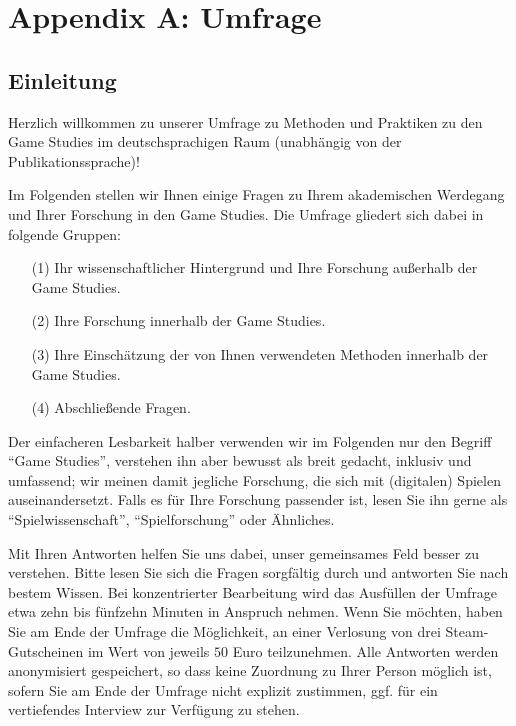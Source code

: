 \documentclass{scrartcl}
\begin{document}
\printbibliography


\clearpage
\section*{Appendix A: Umfrage}


\subsection*{Einleitung}
Herzlich willkommen zu unserer Umfrage zu Methoden und Praktiken zu den Game Studies im deutschsprachigen Raum (unabhängig von der Publikationssprache)!

Im Folgenden stellen wir Ihnen einige Fragen zu Ihrem akademischen Werdegang und Ihrer Forschung in den Game Studies.
Die Umfrage gliedert sich dabei in folgende Gruppen:

\begin{itemize}
   \item[(1)] Ihr wissenschaftlicher Hintergrund und Ihre Forschung außerhalb der Game Studies.
   \item[(2)] Ihre Forschung innerhalb der Game Studies.
   \item[(3)] Ihre Einschätzung der von Ihnen verwendeten Methoden innerhalb der Game Studies.
   \item[(4)] Abschließende Fragen.
\end{itemize}

\noindent Der einfacheren Lesbarkeit halber verwenden wir im Folgenden nur den Begriff \enquote{Game Studies}, verstehen ihn aber bewusst als breit gedacht, inklusiv und umfassend; wir meinen damit jegliche Forschung, die sich mit (digitalen) Spielen auseinandersetzt.
Falls es für Ihre Forschung passender ist, lesen Sie ihn gerne als \enquote{Spielwissenschaft}, \enquote{Spielforschung} oder Ähnliches.

Mit Ihren Antworten helfen Sie uns dabei, unser gemeinsames Feld besser zu verstehen.
Bitte lesen Sie sich die Fragen sorgfältig durch und antworten Sie nach bestem Wissen.
Bei konzentrierter Bearbeitung wird das Ausfüllen der Umfrage etwa zehn bis fünfzehn Minuten in Anspruch nehmen.
Wenn Sie möchten, haben Sie am Ende der Umfrage die Möglichkeit, an einer Verlosung von drei Steam-Gutscheinen im Wert von jeweils $50$ Euro teilzunehmen.
Alle Antworten werden anonymisiert gespeichert, so dass keine Zuordnung zu Ihrer Person möglich ist, sofern Sie am Ende der Umfrage nicht explizit zustimmen, ggf. für ein vertiefendes Interview zur Verfügung zu stehen.
\end{document}
